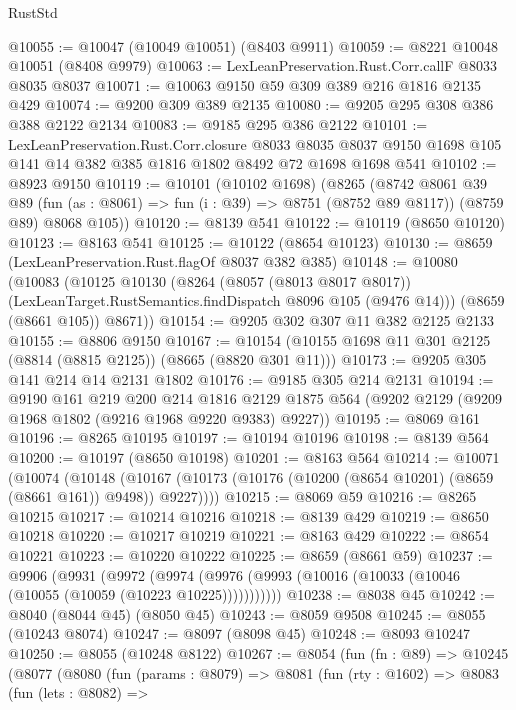 \begin{lexlean}{RustStd}
\begin{coremodule}
{\begin{coremodule}
{{{{{{{{{{{{{{{{{{{{{{{{{{{{{{{{{{{{{{{{{{{{{{{@10055 := @10047 (@10049 @10051) (@8403 @9911)
@10059 := @8221 @10048 @10051 (@8408 @9979)
@10063 := LexLeanPreservation.Rust.Corr.callF @8033 @8035 @8037
@10071 := @10063 @9150 @59 @309 @389 @216 @1816 @2135 @429
@10074 := @9200 @309 @389 @2135
@10080 := @9205 @295 @308 @386 @388 @2122 @2134
@10083 := @9185 @295 @386 @2122
@10101 := LexLeanPreservation.Rust.Corr.closure
    @8033
    @8035
    @8037
    @9150
    @1698
    @105
    @141
    @14
    @382
    @385
    @1816
    @1802
    @8492
    @72
    @1698
    @1698
    @541
@10102 := @8923 @9150
@10119 := @10101
    (@10102 @1698)
    (@8265
      (@8742
        @8061
        @39
        @89
        (fun (as : @8061) => fun (i : @39) => @8751 (@8752 @89 @8117))
        (@8759 @89)
        @8068
        @105))
@10120 := @8139 @541
@10122 := @10119 (@8650 @10120)
@10123 := @8163 @541
@10125 := @10122 (@8654 @10123)
@10130 := @8659 (LexLeanPreservation.Rust.flagOf @8037 @382 @385)
@10148 := @10080
    (@10083
      (@10125
        @10130
        (@8264
          (@8057 (@8013 @8017 @8017))
          (LexLeanTarget.RustSemantics.findDispatch @8096 @105 (@9476 @14)))
        (@8659 (@8661 @105))
        @8671))
@10154 := @9205 @302 @307 @11 @382 @2125 @2133
@10155 := @8806 @9150
@10167 := @10154 (@10155 @1698 @11 @301 @2125 (@8814 (@8815 @2125)) (@8665 (@8820 @301 @11)))
@10173 := @9205 @305 @141 @214 @14 @2131 @1802
@10176 := @9185 @305 @214 @2131
@10194 := @9190
    @161
    @219
    @200
    @214
    @1816
    @2129
    @1875
    @564
    (@9202 @2129 (@9209 @1968 @1802 (@9216 @1968 @9220 @9383) @9227))
@10195 := @8069 @161
@10196 := @8265 @10195
@10197 := @10194 @10196
@10198 := @8139 @564
@10200 := @10197 (@8650 @10198)
@10201 := @8163 @564
@10214 := @10071
    (@10074
      (@10148 (@10167 (@10173 (@10176 (@10200 (@8654 @10201) (@8659 (@8661 @161)) @9498)) @9227))))
@10215 := @8069 @59
@10216 := @8265 @10215
@10217 := @10214 @10216
@10218 := @8139 @429
@10219 := @8650 @10218
@10220 := @10217 @10219
@10221 := @8163 @429
@10222 := @8654 @10221
@10223 := @10220 @10222
@10225 := @8659 (@8661 @59)
@10237 := @9906
    (@9931
      (@9972 (@9974 (@9976 (@9993 (@10016 (@10033 (@10046 (@10055 (@10059 (@10223 @10225)))))))))))
@10238 := @8038 @45
@10242 := @8040 (@8044 @45) (@8050 @45)
@10243 := @8059 @9508
@10245 := @8055 (@10243 @8074)
@10247 := @8097 (@8098 @45)
@10248 := @8093 @10247
@10250 := @8055 (@10248 @8122)
@10267 := @8054
    (fun (fn : @89) =>
    @10245
      (@8077
        (@8080
          (fun (params : @8079) =>
          @8081
            (fun (rty : @1602) =>
            @8083
              (fun (lets : @8082) =>
}}}}}}}}}}}}}}}}}}}}}}}}}}}}}}}}}}}}}}}}}}}}}}}
\end{coremodule}}
\end{coremodule}
\end{lexlean}
